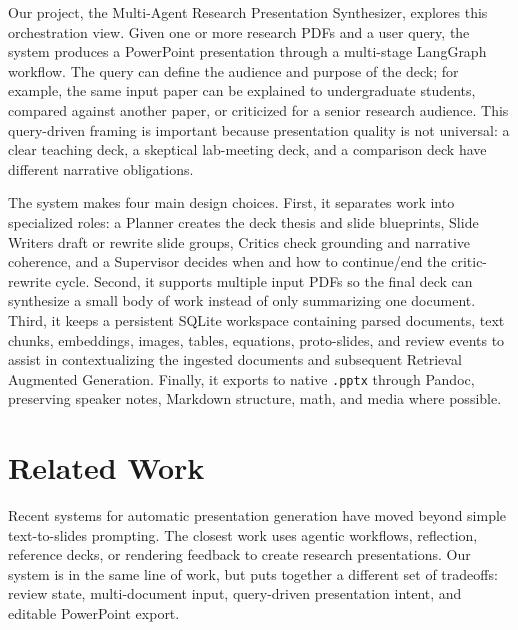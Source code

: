 \documentclass[11pt]{article}
\begin{document}
Our project, the Multi-Agent Research Presentation Synthesizer, explores this orchestration view. Given one or more research PDFs and a user query, the system produces a PowerPoint presentation through a multi-stage LangGraph workflow. The query can define the audience and purpose of the deck; for example, the same input paper can be explained to undergraduate students, compared against another paper, or criticized for a senior research audience. This query-driven framing is important because presentation quality is not universal: a clear teaching deck, a skeptical lab-meeting deck, and a comparison deck have different narrative obligations.

The system makes four main design choices. First, it separates work into specialized roles: a Planner creates the deck thesis and slide blueprints, Slide Writers draft or rewrite slide groups, Critics check grounding and narrative coherence, and a Supervisor decides when and how to continue/end the critic-rewrite cycle. Second, it supports multiple input PDFs so the final deck can synthesize a small body of work instead of only summarizing one document. Third, it keeps a persistent SQLite workspace containing parsed documents, text chunks, embeddings, images, tables, equations, proto-slides, and review events to assist in contextualizing the ingested documents and subsequent Retrieval Augmented Generation. Finally, it exports to native \texttt{.pptx} through Pandoc, preserving speaker notes, Markdown structure, math, and media where possible.

\section{Related Work}

Recent systems for automatic presentation generation have moved beyond simple text-to-slides prompting. The closest work uses agentic workflows, reflection, reference decks, or rendering feedback to create research presentations. Our system is in the same line of work, but puts together a different set of tradeoffs: review state, multi-document input, query-driven presentation intent, and editable PowerPoint export.
\end{document}
